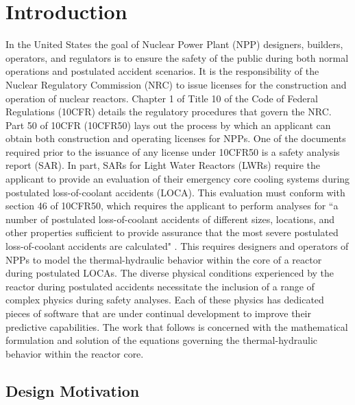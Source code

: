 \chapter{Introduction}
\label{chap:intro}
In the United States the goal of Nuclear Power Plant (NPP) designers, builders, operators, and regulators is to ensure the safety of the public during both normal operations and postulated accident scenarios.
It is the responsibility of the Nuclear Regulatory Commission (NRC) to issue licenses for the construction and operation of nuclear reactors.
Chapter 1 of Title 10 of the Code of Federal Regulations (10CFR) details the regulatory procedures that govern the NRC.
Part 50 of 10CFR (10CFR50) lays out the process by which an applicant can obtain both construction and operating licenses for NPPs.
One of the documents required prior to the issuance of any license under 10CFR50 is a safety analysis report (SAR).
In part, SARs for Light Water Reactors (LWRs) require the applicant to provide an evaluation of their emergency core cooling systems during postulated loss-of-coolant accidents (LOCA).
This evaluation must conform with section 46 of 10CFR50, which requires the applicant to perform analyses for ``a number of postulated loss-of-coolant accidents of different sizes, locations, and other properties sufficient to provide assurance that the most severe postulated loss-of-coolant accidents are calculated" \cite{CFR10}.
This requires designers and operators of NPPs to model the thermal-hydraulic behavior within the core of a reactor during postulated LOCAs.  
The diverse physical conditions experienced by the reactor during postulated accidents necessitate the inclusion of a range of complex physics during safety analyses.
Each of these physics has dedicated pieces of software that are under continual development to improve their predictive capabilities.
The work that follows is concerned with the mathematical formulation and solution of the equations governing the thermal-hydraulic behavior within the reactor core.

\section{Design Motivation}
\label{sect:motivation}

